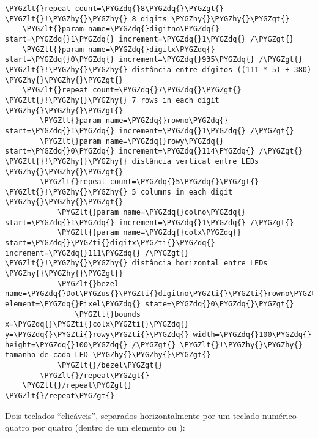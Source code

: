 \documentclass[letterpaper,10pt,brazil]{sphinxmanual}
\def\PYGZus{\char`\_}
\def\PYGZlt{\char`\<}
\def\PYGZgt{\char`\>}
\def\PYGZhy{\char`\-}
\def\PYGZdq{\char`\"}
\def\PYGZti{\char`\~}
\begin{document}
\begin{Verbatim}[commandchars=\\\{\}]
\PYGZlt{}repeat count=\PYGZdq{}8\PYGZdq{}\PYGZgt{} \PYGZlt{}!\PYGZhy{}\PYGZhy{} 8 digits \PYGZhy{}\PYGZhy{}\PYGZgt{}
    \PYGZlt{}param name=\PYGZdq{}digitno\PYGZdq{} start=\PYGZdq{}1\PYGZdq{} increment=\PYGZdq{}1\PYGZdq{} /\PYGZgt{}
    \PYGZlt{}param name=\PYGZdq{}digitx\PYGZdq{} start=\PYGZdq{}0\PYGZdq{} increment=\PYGZdq{}935\PYGZdq{} /\PYGZgt{} \PYGZlt{}!\PYGZhy{}\PYGZhy{} distância entre dígitos ((111 * 5) + 380) \PYGZhy{}\PYGZhy{}\PYGZgt{}
    \PYGZlt{}repeat count=\PYGZdq{}7\PYGZdq{}\PYGZgt{} \PYGZlt{}!\PYGZhy{}\PYGZhy{} 7 rows in each digit \PYGZhy{}\PYGZhy{}\PYGZgt{}
        \PYGZlt{}param name=\PYGZdq{}rowno\PYGZdq{} start=\PYGZdq{}1\PYGZdq{} increment=\PYGZdq{}1\PYGZdq{} /\PYGZgt{}
        \PYGZlt{}param name=\PYGZdq{}rowy\PYGZdq{} start=\PYGZdq{}0\PYGZdq{} increment=\PYGZdq{}114\PYGZdq{} /\PYGZgt{} \PYGZlt{}!\PYGZhy{}\PYGZhy{} distância vertical entre LEDs \PYGZhy{}\PYGZhy{}\PYGZgt{}
        \PYGZlt{}repeat count=\PYGZdq{}5\PYGZdq{}\PYGZgt{} \PYGZlt{}!\PYGZhy{}\PYGZhy{} 5 columns in each digit \PYGZhy{}\PYGZhy{}\PYGZgt{}
            \PYGZlt{}param name=\PYGZdq{}colno\PYGZdq{} start=\PYGZdq{}1\PYGZdq{} increment=\PYGZdq{}1\PYGZdq{} /\PYGZgt{}
            \PYGZlt{}param name=\PYGZdq{}colx\PYGZdq{} start=\PYGZdq{}\PYGZti{}digitx\PYGZti{}\PYGZdq{} increment=\PYGZdq{}111\PYGZdq{} /\PYGZgt{} \PYGZlt{}!\PYGZhy{}\PYGZhy{} distância horizontal entre LEDs \PYGZhy{}\PYGZhy{}\PYGZgt{}
            \PYGZlt{}bezel name=\PYGZdq{}Dot\PYGZus{}\PYGZti{}digitno\PYGZti{}\PYGZti{}rowno\PYGZti{}\PYGZti{}colno\PYGZti{}\PYGZdq{} element=\PYGZdq{}Pixel\PYGZdq{} state=\PYGZdq{}0\PYGZdq{}\PYGZgt{}
                \PYGZlt{}bounds x=\PYGZdq{}\PYGZti{}colx\PYGZti{}\PYGZdq{} y=\PYGZdq{}\PYGZti{}rowy\PYGZti{}\PYGZdq{} width=\PYGZdq{}100\PYGZdq{} height=\PYGZdq{}100\PYGZdq{} /\PYGZgt{} \PYGZlt{}!\PYGZhy{}\PYGZhy{} tamanho de cada LED \PYGZhy{}\PYGZhy{}\PYGZgt{}
            \PYGZlt{}/bezel\PYGZgt{}
        \PYGZlt{}/repeat\PYGZgt{}
    \PYGZlt{}/repeat\PYGZgt{}
\PYGZlt{}/repeat\PYGZgt{}
\end{Verbatim}

Dois teclados ``clicáveis'', separados horizontalmente por um teclado
numérico quatro por quatro (dentro de um elemento  ou
):
\end{document}
